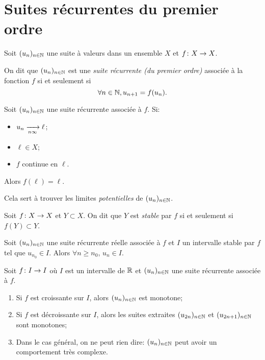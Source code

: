 \documentclass{yann}
\newcommand\U{(u_n)_{n\in\N}}
\begin{document}
\section{Suites récurrentes du premier ordre}


Soit $\U$ une suite à valeurs dans un ensemble $X$
et $f\colon X\to X$.

On dit que $\U$ est une \emph{suite récurrente (du premier ordre)}
associée à la fonction $f$
si et seulement si \[ \forall n\in\mathbb{N}, u_{n+1} = f(u_n). \]


Soit $\U$ une suite récurrente associée à $f$.
Si:
\begin{itemize}
\item
$u_n \xrightarrow[{n\infty}]{}\ell$;
\item
$\ell\in X$;
\item
$f$ continue en $\ell$.
\end{itemize}

Alors $f(\ell) =\ell$.


Cela sert à trouver les limites \emph{potentielles} de $\U$.


Soit $f\colon X\to X$ et $Y\subset X$.
On dit que $Y$ est \emph{stable} par $f$ si et seulement si $f(Y)\subset Y$.


Soit $\U$ une suite récurrente réelle associée à $f$
et $I$ un intervalle stable par $f$ tel que $u_{n_0}\in I$.
Alors $\forall n\geq n_0$, $u_n\in I$.


Soit $f\colon I\to I$ où $I$ est un intervalle de $\mathbb{R}$
et $\U$ une suite récurrente associée à $f$.
\begin{enumerate}
\item
Si $f$ est croissante sur $I$, alors $\U$ est monotone;
\item
Si $f$ est décroissante sur $I$, alors les suites extraites
  $(u_{2n})_{n\in\mathbb{N}}$ et $(u_{2n+1})_{n\in\mathbb{N}}$ sont monotones;
\item
Dans le cas général, on ne peut rien dire: $\U$ peut avoir un comportement très complexe.
\end{enumerate}
\end{document}
